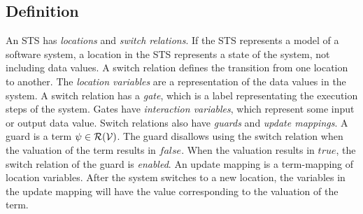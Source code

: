 \subsection{Definition}\label{sec:sts_definition}
An STS has \textit{locations} and \textit{switch relations}. If the STS represents a model of a software system, a location in the STS represents a state of the system, not including data values. A switch relation defines the transition from one location to another. The \textit{location variables} are a representation of the data values in the system. A switch relation has a \textit{gate}, which is a label representating the execution steps of the system. Gates have \textit{interaction variables}, which represent some input or output data value. Switch relations also have \textit{guards} and \textit{update mappings}. A guard is a term $\psi \in \mathcal{R}(\mathcal{V})$. The guard disallows using the switch relation when the valuation of the term results in $\mathit{false}$. When the valuation results in $\mathit{true}$, the switch relation of the guard is \textit{enabled}. An update mapping is a term-mapping of location variables. After the system switches to a new location, the variables in the update mapping will have the value corresponding to the valuation of the term.
\vspace{5px}
